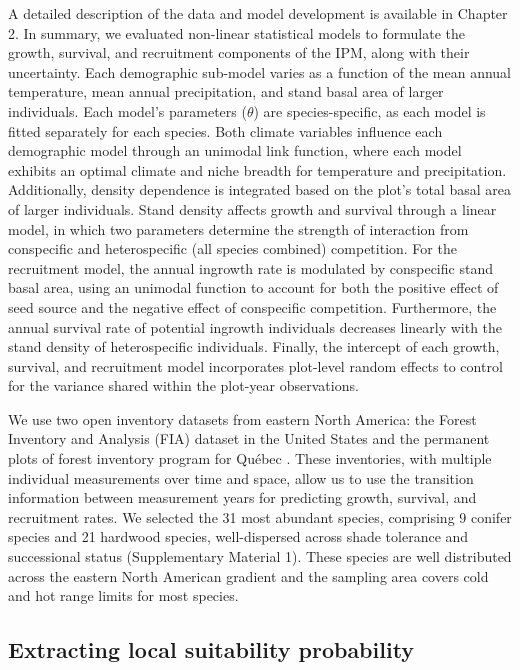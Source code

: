 A detailed description of the data and model development is available in
Chapter 2. In summary, we evaluated non-linear statistical models to
formulate the growth, survival, and recruitment components of the IPM,
along with their uncertainty. Each demographic sub-model varies as a
function of the mean annual temperature, mean annual precipitation, and
stand basal area of larger individuals. Each model's parameters
(\(\theta\)) are species-specific, as each model is fitted separately
for each species. Both climate variables influence each demographic
model through an unimodal link function, where each model exhibits an
optimal climate and niche breadth for temperature and precipitation.
Additionally, density dependence is integrated based on the plot's total
basal area of larger individuals. Stand density affects growth and
survival through a linear model, in which two parameters determine the
strength of interaction from conspecific and heterospecific (all species
combined) competition. For the recruitment model, the annual ingrowth
rate is modulated by conspecific stand basal area, using an unimodal
function to account for both the positive effect of seed source and the
negative effect of conspecific competition. Furthermore, the annual
survival rate of potential ingrowth individuals decreases linearly with
the stand density of heterospecific individuals. Finally, the intercept
of each growth, survival, and recruitment model incorporates plot-level
random effects to control for the variance shared within the plot-year
observations.

We use two open inventory datasets from eastern North America: the
Forest Inventory and Analysis (FIA) dataset in the United States
\citep{OConnell2007} and the permanent plots of forest inventory program
for Québec \citep{Naturelles2016}. These inventories, with multiple
individual measurements over time and space, allow us to use the
transition information between measurement years for predicting growth,
survival, and recruitment rates. We selected the 31 most abundant
species, comprising 9 conifer species and 21 hardwood species,
well-dispersed across shade tolerance and successional status
(Supplementary Material 1). These species are well distributed across
the eastern North American gradient and the sampling area covers cold
and hot range limits for most species.

\hypertarget{extracting-local-suitability-probability}{%
\subsection{Extracting local suitability
probability}\label{extracting-local-suitability-probability}}

